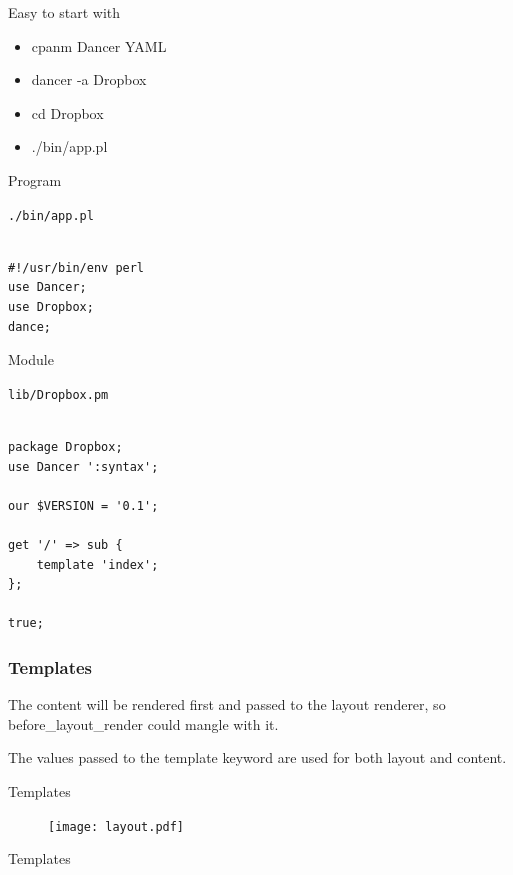 \begin{frame}[fragile]{Easy to start with}
\begin{itemize}
\item cpanm Dancer YAML
\item dancer -a Dropbox
\item cd Dropbox
\item ./bin/app.pl
\end{itemize}
\end{frame}
\begin{frame}[fragile]{Program}

\verb|./bin/app.pl|

\begin{lstlisting}

#!/usr/bin/env perl
use Dancer;
use Dropbox;
dance;

\end{lstlisting}

\end{frame}

\begin{frame}[fragile]{Module}

\verb|lib/Dropbox.pm|

\begin{lstlisting}

package Dropbox;
use Dancer ':syntax';

our $VERSION = '0.1';

get '/' => sub {
    template 'index';
};

true;
\end{lstlisting}
\end{frame}

\subsubsection{Templates}

The content will be rendered first and passed to the
layout renderer, so before\_layout\_render could mangle
with it.

The values passed to the template keyword are used
for both layout and content.

\begin{frame}{Templates}
\begin{figure}
\texttt{[image: layout.pdf]}
\end{figure}
\end{frame}{Templates}

